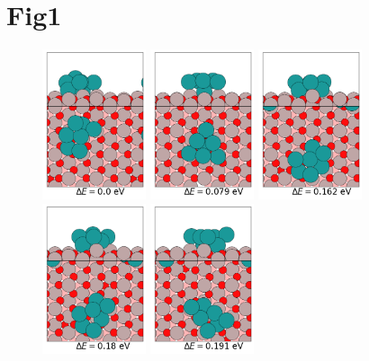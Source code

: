 \documentclass{article}
\begin{document}
\section{Fig1}
\begin{figure}[htp]
\begin{center}
\subfigure
{
  \includegraphics[width=1.2in]{Pt7_Al2O3_Lowlying_DFTrelxed_0.png}
}
\subfigure
{
  \includegraphics[width=1.2in]{Pt7_Al2O3_Lowlying_DFTrelxed_1.png}
}
\subfigure
{
  \includegraphics[width=1.2in]{Pt7_Al2O3_Lowlying_DFTrelxed_2.png}
}
\subfigure
{
  \includegraphics[width=1.2in]{Pt7_Al2O3_Lowlying_DFTrelxed_3.png}
}
\subfigure
{
  \includegraphics[width=1.2in]{Pt7_Al2O3_Lowlying_DFTrelxed_5.png}
}
\end{center}
\end{figure}
\end{document}
